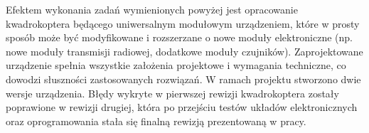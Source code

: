 Efektem wykonania zadań wymienionych powyżej jest opracowanie kwadrokoptera będącego uniwersalnym modułowym urządzeniem, które w prosty sposób może być modyfikowane i rozszerzane o nowe moduły elektroniczne (np. nowe moduły transmisji radiowej, dodatkowe moduły czujników). 
Zaprojektowane urządzenie spełnia wszystkie założenia projektowe i wymagania techniczne, co dowodzi słuszności zastosowanych rozwiązań.
W ramach projektu stworzono dwie wersje urządzenia. Błędy wykryte w pierwszej rewizji kwadrokoptera zostały poprawione w rewizji drugiej, która po przejściu testów układów elektronicznych oraz oprogramowania stała się finalną rewizją prezentowaną w pracy. 

